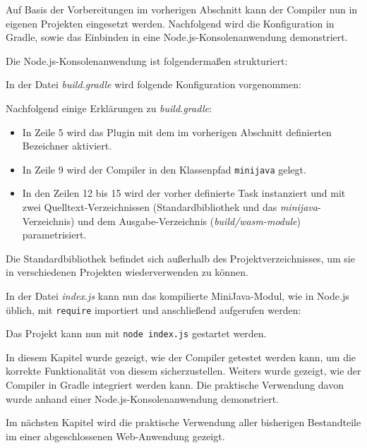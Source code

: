 Auf Basis der Vorbereitungen im vorherigen Abschnitt kann der Compiler nun in eigenen Projekten eingesetzt werden. Nachfolgend wird die Konfiguration in Gradle, sowie das Einbinden in eine Node.js-Konsolenanwendung demonstriert.

Die Node.js-Konsolenanwendung ist folgendermaßen strukturiert:



In der Datei \emph{build.gradle} wird folgende Konfiguration vorgenommen:



Nachfolgend einige Erklärungen zu \emph{build.gradle}:
\begin{itemize}
    \item In Zeile 5 wird das Plugin mit dem im vorherigen Abschnitt definierten Bezeichner aktiviert.
    \item In Zeile 9 wird der Compiler in den Klassenpfad \lstinline{minijava} gelegt.
    \item In den Zeilen 12 bis 15 wird der vorher definierte Task instanziert und mit zwei Quelltext-Verzeichnissen (Standardbibliothek und das \emph{minijava}-Verzeichnis) und dem Ausgabe-Verzeichnis (\emph{build/wasm-module}) parametrisiert.
\end{itemize}

Die Standardbibliothek befindet sich außerhalb des Projektverzeichnisses, um sie in verschiedenen Projekten wiederverwenden zu können.

In der Datei \emph{index.js} kann nun das kompilierte MiniJava-Modul, wie in Node.js üblich, mit \lstinline{require} importiert und anschließend aufgerufen werden:



Das Projekt kann nun mit \lstinline{node index.js} gestartet werden.

\vspace{4em}
In diesem Kapitel wurde gezeigt, wie der Compiler getestet werden kann, um die korrekte Funktionalität von diesem sicherzustellen. Weiters wurde gezeigt, wie der Compiler in Gradle integriert werden kann. Die praktische Verwendung davon wurde anhand einer Node.js-Konsolenanwendung demonstriert.

Im nächsten Kapitel wird die praktische Verwendung aller bisherigen Bestandteile im einer abgeschlossenen Web-Anwendung gezeigt.
